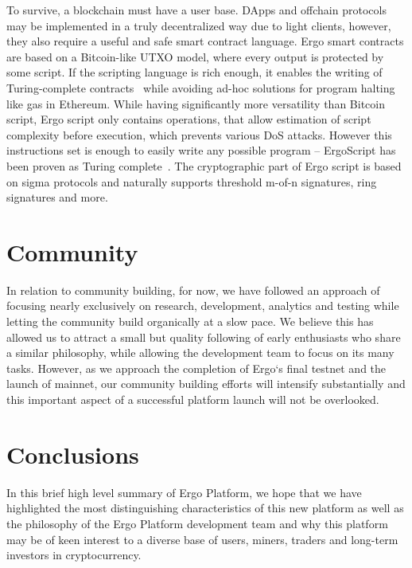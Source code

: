 \documentclass[]{article}
\begin{document}
    To survive, a blockchain must have a user base. DApps and offchain protocols may be
    implemented in a truly decentralized way due to light clients, however, they also require a useful
    and safe smart contract language. Ergo smart contracts are based on a Bitcoin-like UTXO
    model, where every output is protected by some script. If the scripting language is rich enough,
    it enables the writing of Turing-complete contracts~\cite{chepurnoy2018self} while avoiding ad-hoc solutions for
    program halting like gas in Ethereum. While having significantly more versatility than Bitcoin
    script, Ergo script only contains operations, that allow estimation of script complexity before
    execution, which prevents various DoS attacks. However this instructions set is enough to
    easily write any possible program -- ErgoScript has been proven as Turing complete~\cite{chepurnoy2018self}. The
    cryptographic part of Ergo script is based on sigma protocols and naturally supports threshold
    m-of-n signatures, ring signatures and more.

    \section{Community}

    In relation to community building, for now, we have followed an approach of focusing nearly
    exclusively on research, development, analytics and testing while letting the community build
    organically at a slow pace. We believe this has allowed us to attract a small but quality following
    of early enthusiasts who share a similar philosophy, while allowing the development team to
    focus on its many tasks. However, as we approach the completion of Ergo`s final testnet and the
    launch of mainnet, our community building efforts will intensify substantially and this important
    aspect of a successful platform launch will not be overlooked.

    \section{Conclusions}

    In this brief high level summary of Ergo Platform, we hope that we have highlighted the most
    distinguishing characteristics of this new platform as well as the philosophy of the Ergo Platform
    development team and why this platform may be of keen interest to a diverse base of users,
    miners, traders and long-term investors in cryptocurrency.

    
\end{document}
